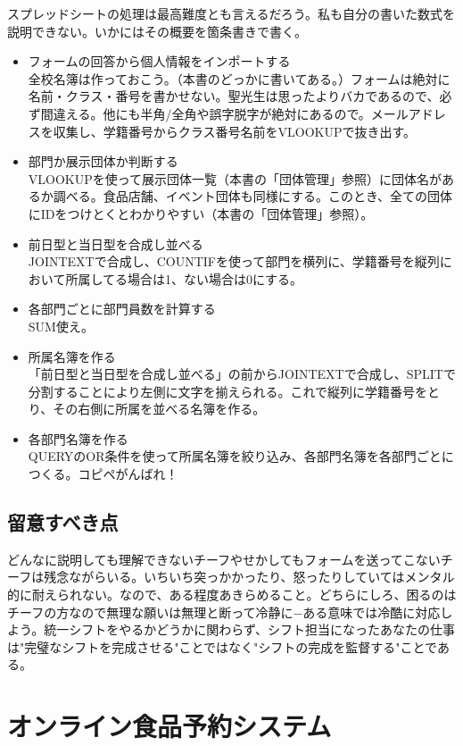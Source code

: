 \documentclass[dvipdfmx,jb5]{jreport}
\begin{document}
スプレッドシートの処理は最高難度とも言えるだろう。私も自分の書いた数式を説明できない。いかにはその概要を箇条書きで書く。
\begin{itemize}
      \item フォームの回答から個人情報をインポートする\\
            全校名簿は作っておこう。（本書のどっかに書いてある。）フォームは絶対に名前・クラス・番号を書かせない。聖光生は思ったよりバカであるので、必ず間違える。他にも半角/全角や誤字脱字が絶対にあるので。メールアドレスを収集し、学籍番号からクラス番号名前をVLOOKUPで抜き出す。
      \item 部門か展示団体か判断する\\
            VLOOKUPを使って展示団体一覧（本書の「団体管理」参照）に団体名があるか調べる。食品店舗、イベント団体も同様にする。このとき、全ての団体にIDをつけとくとわかりやすい（本書の「団体管理」参照）。
      \item 前日型と当日型を合成し並べる\\
            JOINTEXTで合成し、COUNTIFを使って部門を横列に、学籍番号を縦列において所属してる場合は1、ない場合は0にする。
      \item 各部門ごとに部門員数を計算する\\
            SUM使え。
      \item 所属名簿を作る\\
            「前日型と当日型を合成し並べる」の前からJOINTEXTで合成し、SPLITで分割することにより左側に文字を揃えられる。これで縦列に学籍番号をとり、その右側に所属を並べる名簿を作る。
      \item 各部門名簿を作る\\
            QUERYのOR条件を使って所属名簿を絞り込み、各部門名簿を各部門ごとにつくる。コピペがんばれ！
\end{itemize}

\subsection{留意すべき点}
どんなに説明しても理解できないチーフやせかしてもフォームを送ってこないチーフは残念ながらいる。いちいち突っかかったり、怒ったりしていてはメンタル的に耐えられない。なので、ある程度あきらめること。どちらにしろ、困るのはチーフの方なので無理な願いは無理と断って冷静に−ある意味では冷酷に対応しよう。統一シフトをやるかどうかに関わらず、シフト担当になったあなたの仕事は"完璧なシフトを完成させる"ことではなく"シフトの完成を監督する"ことである。

\section{オンライン食品予約システム}\label{sec:オンライン食品予約システム}
\end{document}
